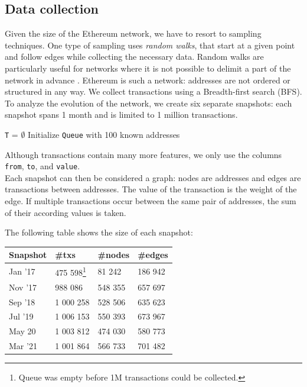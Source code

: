 \documentclass[10pt,a4paper]{article}
\begin{document}
\begin{multicols}{2}
\section{Data collection}
Given the size of the Ethereum network, we have to resort to sampling techniques. One type of sampling uses \textit{random walks}, that start at a given point and follow edges while collecting the necessary data. Random walks are particularly useful for networks where it is not possible to delimit a part of the network in advance \cite{Becchetti06acomparison}. Ethereum is such a network: addresses are not ordered or structured in any way. We collect transactions using a Breadth-first search (BFS). To analyze the evolution of the network, we create six separate snapshots: each snapshot spans 1 month and is limited to 1 million transactions.

\medskip
\begin{algorithm}[H]
\SetAlgoLined
\hspace{5pt}\texttt{T} = $\emptyset$\newline
Initialize \texttt{Queue} with 100 known addresses
\end{algorithm}

Although transactions contain many more features, we only use the columns \texttt{from}, \texttt{to}, and \texttt{value}.\\
Each snapshot can then be considered a graph: nodes are addresses and edges are transactions between addresses. The value of the transaction is the weight of the edge. If multiple transactions occur between the same pair of addresses, the sum of their according values is taken. 

The following table shows the size of each snapshot:\\
\vspace{5pt}
\bgroup
\def\arraystretch{1.5}
\begin{tabular}{p{}|p{}|p{}|p{}}
\textbf{Snapshot} & \textbf{\#txs} & \textbf{\#nodes} & \textbf{\#edges} \\ 
\hline 
Jan '17 & 475 598\footnote{Queue was empty before 1M transactions could be collected.}& 81 242 & 186 942  \\
Nov '17 & 988 086 & 548 355 & 657 697  \\
Sep '18 & 1 000 258 & 528 506 & 635 623 \\
Jul '19 & 1 006 153 & 550 393 & 673 967 \\
May 20 & 1 003 812 & 474 030 & 580 773 \\
Mar '21 & 1 001 864 & 566 733 & 701 482 \\
\end{tabular}
\egroup


\end{multicols}
\end{document}
